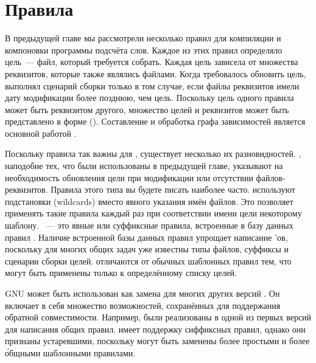 \chapter{Правила}
\label{chap:rules}

В предыдущей главе мы рассмотрели несколько правил для компиляции и
компоновки программы подсчёта слов. Каждое из этих правил определяло
цель~--- файл, который требуется собрать. Каждая цель зависела от
множества реквизитов, которые также являлись файлами. Когда
требовалось обновить цель, \GNUmake{} выполнял сценарий сборки только
в том случае, если файлы реквизитов имели дату модификации более
позднюю, чем цель. Поскольку цель одного правила может быть реквизитом
другого, множество целей и реквизитов может быть представлено в форме
 (). Составление
и обработка графа зависимостей является основной работой \GNUmake{}.

Поскольку правила так важны для \GNUmake{}, существует несколько их
разновидностей. , наподобие тех, что были
использованы в предыдущей главе, указывают на необходимость обновления
цели при модификации или отсутствии файлов-реквизитов. Правила этого
типа вы будете писать наиболее часто.
 используют подстановки (wildcards) вместо
явного указания имён файлов.  Это позволяет \GNUmake{} применять такие
правила каждый раз при соответствии имени цели некоторому шаблону.
~--- это явные или суффиксные правила,
встроенные в базу данных правил \GNUmake{}. Наличие встроенной базы
данных правил упрощает написание \Makefile'ов, поскольку для многих
общих задач уже известны типы файлов, суффиксы и сценарии сборки
целей.
 отличаются от обычных
шаблонных правил тем, что могут быть применены только к определённому
списку целей.

GNU \GNUmake{} может быть использован как замена для многих других
версий \GNUmake{}. Он включает в себя множество возможностей,
сохранённых для поддержания обратной совместимости. Например,
 были реализованы в одной из первых версий
\GNUmake{} для написания общих правил. \GNUmake{} имеет поддержку
сиффиксных правил, однако они признаны устаревшими, поскольку могут
быть заменены более простыми и более \'{о}бщными шаблонными правилами.









